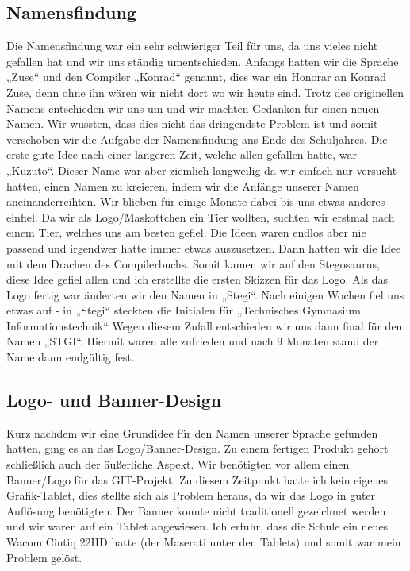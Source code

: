 \documentclass[a4paper, 12pt]{article}
\begin{document}
\subsection{Namensfindung}
Die Namensfindung war ein sehr schwieriger Teil für uns, da uns vieles nicht gefallen hat und wir uns ständig umentschieden. Anfangs hatten wir die Sprache „Zuse“ und den Compiler „Konrad“ genannt, dies war ein Honorar an Konrad Zuse, denn ohne ihn wären wir nicht dort wo wir heute sind. Trotz des originellen Namens entschieden wir uns um und wir machten Gedanken für einen neuen Namen. Wir wussten, dass dies nicht das dringendste Problem ist und somit verschoben wir die Aufgabe der Namensfindung ans Ende des Schuljahres. Die erste gute Idee nach einer längeren Zeit, welche allen gefallen hatte, war „Kuzuto“. Dieser Name war aber ziemlich langweilig da wir einfach nur versucht hatten, einen Namen zu kreieren, indem wir die Anfänge unserer Namen aneinanderreihten. Wir blieben für einige Monate dabei bis uns etwas anderes einfiel. 
Da wir als Logo/Maskottchen ein Tier wollten, suchten wir erstmal nach einem Tier, welches uns am besten gefiel. Die Ideen waren endlos aber nie passend und irgendwer hatte immer etwas auszusetzen. Dann hatten wir die Idee mit dem Drachen des Compilerbuchs. Somit kamen wir auf den Stegosaurus, diese Idee gefiel allen und ich erstellte die ersten Skizzen für das Logo. 
Als das Logo fertig war änderten wir den Namen in „Stegi“. Nach einigen Wochen fiel uns etwas auf - in „Stegi“ steckten die Initialen für „Technisches Gymnasium Informationstechnik“ Wegen diesem Zufall entschieden wir uns dann final für den Namen „STGI“. Hiermit waren alle zufrieden und nach 9 Monaten stand der Name dann endgültig fest.

\subsection{Logo- und Banner-Design}
Kurz nachdem wir eine Grundidee für den Namen unserer Sprache gefunden hatten, ging es an das Logo/Banner-Design. Zu einem fertigen Produkt gehört schließlich auch der äußerliche Aspekt. Wir benötigten vor allem einen Banner/Logo für das GIT-Projekt. 
Zu diesem Zeitpunkt hatte ich kein eigenes Grafik-Tablet, dies stellte sich als Problem heraus, da wir das Logo in guter Auflösung benötigten. Der Banner konnte nicht traditionell gezeichnet werden und wir waren auf ein Tablet angewiesen. Ich erfuhr, dass die Schule ein neues Wacom Cintiq 22HD hatte (der Maserati unter den Tablets) und somit war mein Problem gelöst.
\end{document}
